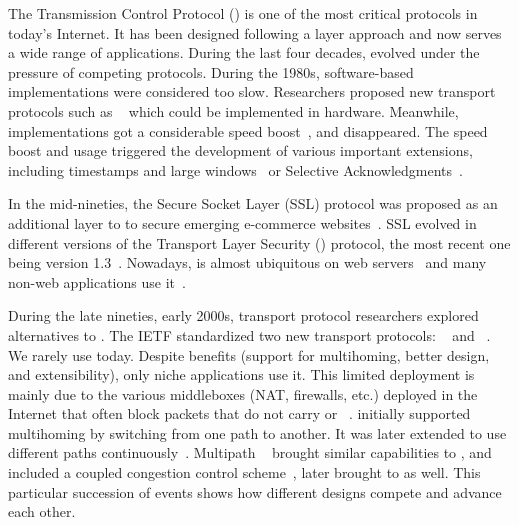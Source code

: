 The Transmission Control Protocol (\tcp) \cite{rfc793} is one of the most
critical protocols in today's Internet. It has been designed following a
layer approach and now serves a wide range of
applications. During the last four decades, \tcp evolved under
the pressure of competing protocols. During the 1980s, software-based \tcp
implementations were considered too slow. Researchers proposed new transport
protocols such as \xtp~\cite{sanders1990xpress} which could be implemented in
hardware. Meanwhile, \tcp implementations got a considerable speed
boost~\cite{clark1989analysis}, and \xtp disappeared. The \tcp speed boost and
usage triggered the development of various important \tcp extensions, including
timestamps and large windows~\cite{rfc1323} or Selective
Acknowledgments~\cite{rfc2018}.

In the mid-nineties, the Secure Socket Layer (SSL) protocol was proposed as an
additional layer to \tcp to secure emerging e-commerce 
websites~\cite{draft-hickman-netscape-ssl}. SSL evolved in different versions 
of the Transport Layer Security (\tls) protocol, the most recent one being 
version 1.3~\cite{rfc8446}. %
Nowadays, \tls is almost ubiquitous on web servers~\cite{holz2019era} and many 
non-web applications use it~\cite{anderson2019tls}.

During the late nineties, early 2000s, transport protocol researchers explored
alternatives to \tcp. The IETF standardized two new transport protocols:
\dccp~\cite{kohler2006designing} and \sctp~\cite{rfc4960}. We rarely use \dccp
today. Despite \sctp benefits (support for multihoming, better design, and
extensibility), only niche applications use it. %
This limited deployment is mainly due to the various middleboxes (NAT,
firewalls, etc.) deployed in 
the Internet that often block packets that do not carry \tcp or
\udp~\cite{honda2011still}.  \sctp initially supported multihoming by switching
from one path to another. It was later extended to use different
paths continuously~\cite{iyengar2006concurrent}. Multipath
\tcp~\cite{rfc6824,raiciu2012hard} brought similar capabilities to \tcp, and
included a coupled congestion control scheme~\cite{wischik2011design}, later
brought to \sctp as well. This particular succession of events shows how
different designs compete and advance each other.


